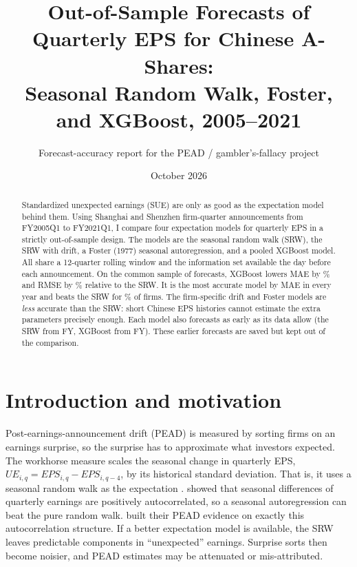 \documentclass[11pt]{article}
\title{Out-of-Sample Forecasts of Quarterly EPS for Chinese A-Shares:\\
Seasonal Random Walk, Foster, and XGBoost, 2005--2021}
\author{Forecast-accuracy report for the PEAD / gambler's-fallacy project}
\date{October 2026}
\begin{document}
\maketitle

\begin{abstract}
\noindent Standardized unexpected earnings (SUE) are only as good as the expectation model behind them. Using
\NTargets{} Shanghai and Shenzhen firm-quarter announcements from FY2005Q1 to FY2021Q1, I compare four expectation
models for quarterly EPS in a strictly out-of-sample design. The models are the seasonal random walk (SRW), the SRW with drift,
a Foster (1977) seasonal autoregression, and a pooled XGBoost model. All share a 12-quarter rolling window and the
information set available the day before each announcement. On the common sample of \NCommon{} forecasts, XGBoost
lowers MAE by \dMAExgb\% and RMSE by \dRMSExgb\% relative to the SRW. It is the most accurate model by MAE in every
year and beats the SRW for \FirmBetterxgb\% of firms. The firm-specific drift and Foster models are \emph{less}
accurate than the SRW: short Chinese EPS histories cannot estimate the extra parameters precisely enough. Each model
also forecasts as early as its data allow (the SRW from FY\Firstrw, XGBoost from FY\Firstxgb). These earlier
forecasts are saved but kept out of the comparison.
\end{abstract}

\section{Introduction and motivation}

Post-earnings-announcement drift (PEAD) is measured by sorting firms on an earnings surprise, so the surprise has
to approximate what investors expected. The workhorse measure scales the seasonal change in quarterly EPS,
$UE_{i,q}=EPS_{i,q}-EPS_{i,q-4}$, by its historical standard deviation. That is, it uses a seasonal random walk as the
expectation \citep{bernard1990}. \citet{foster1977} showed that seasonal differences of quarterly earnings are
positively autocorrelated, so a seasonal autoregression can beat the pure random walk. \citet{bernard1990} built their
PEAD evidence on exactly this autocorrelation structure. If a better expectation model is available, the SRW leaves
predictable components in ``unexpected'' earnings. Surprise sorts then become noisier, and PEAD estimates may be
attenuated or mis-attributed.
\end{document}
